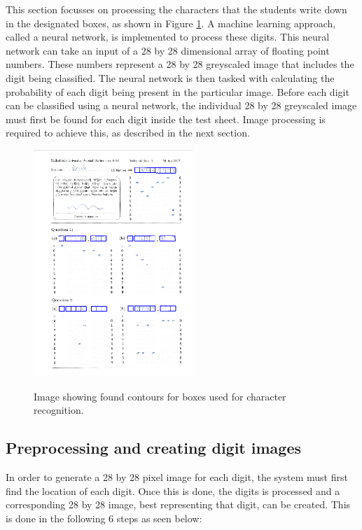 This section focusses on processing the characters that the students write down in the designated boxes, as shown in Figure \ref{fig:sa}. A machine learning approach, called a neural network, is implemented to process these digits. This neural network can take an input of a 28 by 28 dimensional array of floating point numbers. These numbers represent a 28 by 28 greyscaled image that includes the digit being classified. The neural network is then tasked with calculating the probability of each digit being present in the particular image. Before each digit can be classified using a neural network, the individual 28 by 28 greyscaled image must first be found for each digit inside the test sheet. Image processing is required to achieve this, as described in the next section.
\begin{figure}
  \centering
  \includegraphics[width=6cm]{DigitScan}\\
  \caption{Image showing found contours for boxes used for character recognition.}
  \label{fig:sa}
\end{figure}

\subsection{Preprocessing and creating digit images}
\label{sec:preprocess}

In order to generate a 28 by 28 pixel image for each digit, the system must first find the location of each digit. Once this is done, the digits is processed and a corresponding 28 by 28 image, best representing that digit, can be created. This is done in the following 6 steps as seen below:

